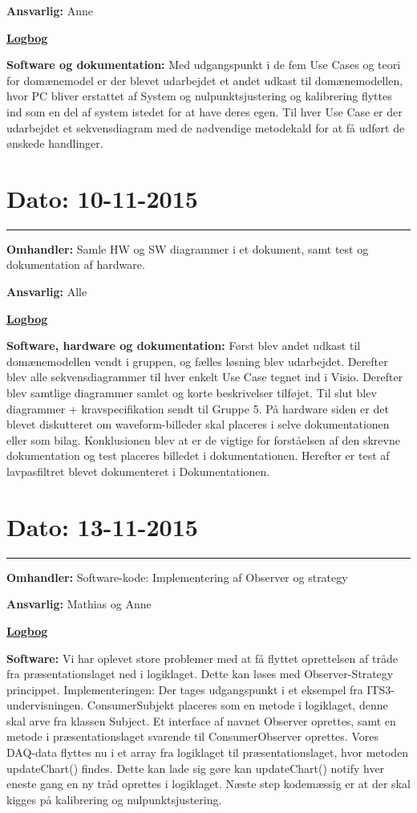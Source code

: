 \textbf{Ansvarlig:} Anne

\underline{\textbf{Logbog}}

\textbf{Software og dokumentation: }Med udgangspunkt i de fem Use Cases og teori for domænemodel er der blevet udarbejdet et andet udkast til domænemodellen, hvor PC bliver erstattet af System og nulpunktsjustering og kalibrering flyttes ind som en del af system istedet for at have deres egen.
Til hver Use Case er der udarbejdet et sekvensdiagram med de nødvendige metodekald for at få udført de ønskede handlinger.
\\

\section{Dato: 10-11-2015}
\hrule
\textbf{Omhandler:} Samle HW og SW diagrammer i et dokument, samt test og dokumentation af hardware.

\textbf{Ansvarlig:} Alle

\underline{\textbf{Logbog}}

\textbf{Software, hardware og dokumentation: }Først blev andet udkast til domænemodellen vendt i gruppen, og fælles løsning blev udarbejdet. Derefter blev alle sekvensdiagrammer til hver enkelt Use Case tegnet ind i Visio. Derefter blev samtlige diagrammer samlet og korte beskrivelser tilføjet. Til slut blev diagrammer + kravspecifikation sendt til Gruppe 5. 
På hardware siden er det blevet diskutteret om waveform-billeder skal placeres i selve dokumentationen eller som bilag. Konklusionen blev at er de vigtige for forståelsen af den skrevne dokumentation og test placeres billedet i dokumentationen. Herefter er test af lavpasfiltret blevet dokumenteret i Dokumentationen.
\\

\section{Dato: 13-11-2015}
\hrule
\textbf{Omhandler:} Software-kode: Implementering af Observer og strategy

\textbf{Ansvarlig:} Mathias og Anne

\underline{\textbf{Logbog}}

\textbf{Software: }Vi har oplevet store problemer med at få flyttet oprettelsen af tråde fra præsentationslaget ned i logiklaget. Dette kan løses med Observer-Strategy princippet. 
Implementeringen: Der tages udgangspunkt i et eksempel fra ITS3-undervisningen. ConsumerSubjekt placeres som en metode i logiklaget, denne skal arve fra klassen Subject. Et interface af navnet Observer oprettes, samt en metode i præsentationslaget svarende til ConsumerObserver oprettes. Vores DAQ-data flyttes nu i et array fra logiklaget til præsentationslaget, hvor metoden updateChart() findes. Dette kan lade sig gøre kan updateChart() notify hver eneste gang en ny tråd oprettes i logiklaget. 
Næste step kodemæssig er at der skal kigges på kalibrering og nulpunktsjustering.
\\